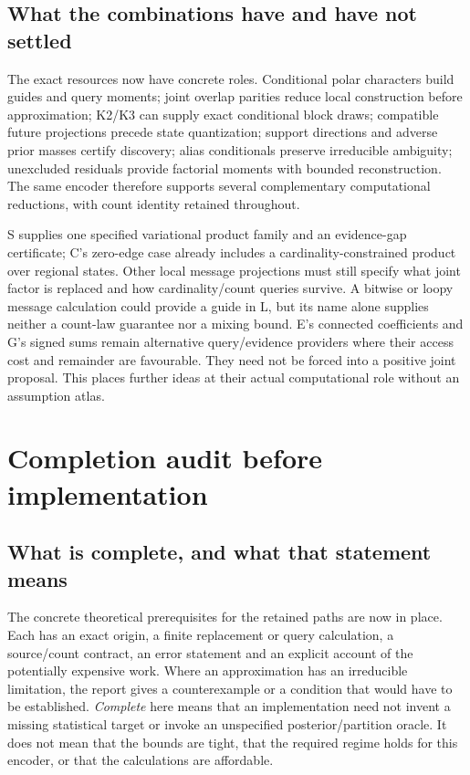 \documentclass[10pt,a4paper]{article}
\begin{document}
\subsection{What the combinations have and have not settled}
The exact resources now have concrete roles. Conditional polar characters build guides and query moments;
joint overlap parities reduce local construction before approximation; K2/K3 can supply exact conditional
block draws; compatible future projections precede state quantization; support directions and adverse prior
masses certify discovery; alias conditionals preserve irreducible ambiguity; unexcluded residuals provide
factorial moments with bounded reconstruction. The same encoder therefore supports several complementary
computational reductions, with count identity retained throughout.

S supplies one specified variational product family and an evidence-gap certificate; C's zero-edge case
already includes a cardinality-constrained product over regional states. Other local message projections
must still specify what joint factor is replaced and how cardinality/count queries survive. A bitwise or loopy
message calculation could provide a guide in L, but its name alone supplies neither a count-law guarantee
nor a mixing bound. E's connected coefficients and G's signed sums remain alternative query/evidence
providers where their access cost and remainder are favourable. They need not be forced into a positive
joint proposal. This places further ideas at their actual computational role without an assumption atlas.

\clearpage
\section{Completion audit before implementation}
\label{sec:completion-audit}
\subsection{What is complete, and what that statement means}
The concrete theoretical prerequisites for the retained paths are now in place. Each has an exact
origin, a finite replacement or query calculation, a source/count contract, an error statement and an
explicit account of the potentially expensive work. Where an approximation has an irreducible limitation,
the report gives a counterexample or a condition that would have to be established. \emph{Complete} here
means that an implementation need not invent a missing statistical target or invoke an unspecified
posterior/partition oracle. It does not mean that the bounds are tight, that the required regime holds
for this encoder, or that the calculations are affordable.
\end{document}
